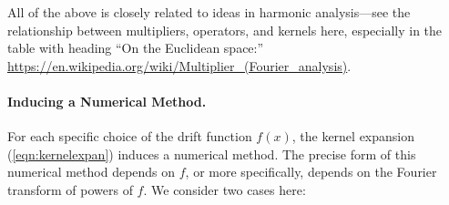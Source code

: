 \documentclass[11pt,letterpaper]{article}
\begin{document}
All of the above is closely related to ideas in harmonic analysis---see the relationship between multipliers, operators, and kernels here, especially in the table with heading ``On the Euclidean space:''\\
\url{https://en.wikipedia.org/wiki/Multiplier_(Fourier_analysis)}.

\paragraph{Inducing a Numerical Method.} For each specific choice of the drift function $f(x)$, the kernel expansion (\ref{eqn:kernelexpan}) induces a numerical method.  The precise form of this numerical method depends on $f$, or more specifically, depends on the Fourier transform of powers of $f$.  We consider two cases here:
\end{document}
